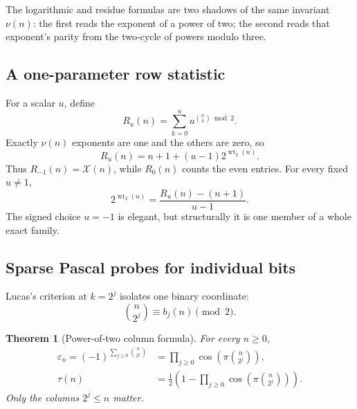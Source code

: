 \documentclass[11pt,oneside]{article}
\numberwithin{equation}{section}
\newtheorem{theorem}{Theorem}[section]
\theoremstyle{definition}
\theoremstyle{remark}
\newcommand{\wt}{\operatorname{wt}_2}
\newcommand{\eps}{\varepsilon}
\begin{document}
The logarithmic and residue formulas are two shadows of the same invariant
\(\nu(n)\): the first reads the exponent of a power of two; the second reads
that exponent's parity from the two-cycle of powers modulo three.

\subsection{A one-parameter row statistic}

For a scalar \(u\), define
\begin{equation}
  R_u(n)=\sum_{k=0}^{n}u^{\binom nk\bmod2}.
  \label{p1:eq:Ru-definition}
\end{equation}
Exactly \(\nu(n)\) exponents are one and the others are zero, so
\begin{equation}
  \boxed{
  R_u(n)=n+1+(u-1)2^{\wt(n)}.}
  \label{p1:eq:Ru-exact}
\end{equation}
Thus \(R_{-1}(n)=\mathcal X(n)\), while \(R_0(n)\) counts the even entries.
For every fixed \(u\ne1\),
\begin{equation}
  2^{\wt(n)}=\frac{R_u(n)-(n+1)}{u-1}.
  \label{p1:eq:Ru-recovery}
\end{equation}
The signed choice \(u=-1\) is elegant, but structurally it is one member of a
whole exact family.

\subsection{Sparse Pascal probes for individual bits}

Lucas's criterion at \(k=2^j\) isolates one binary coordinate:
\begin{equation}
  \binom{n}{2^j}\equiv b_j(n)\pmod2.
  \label{p1:eq:pascal-bit-probe}
\end{equation}

\begin{theorem}[Power-of-two column formula]
\label{p1:thm:sparse-pascal-probes}
For every \(n\ge0\),
\begin{align}
  \boxed{
  \eps_n=(-1)^{\sum_{j\ge0}\binom{n}{2^j}}}
  &=\prod_{j\ge0}\cos\!\left(\pi\binom{n}{2^j}\right),
  \label{p1:eq:sparse-pascal-sign}\\
  \tau(n)&=\frac12\left(
      1-\prod_{j\ge0}\cos\!\left(\pi\binom{n}{2^j}\right)
    \right).
  \label{p1:eq:sparse-pascal-bit}
\end{align}
Only the columns \(2^j\le n\) matter.
\end{theorem}
\end{document}
